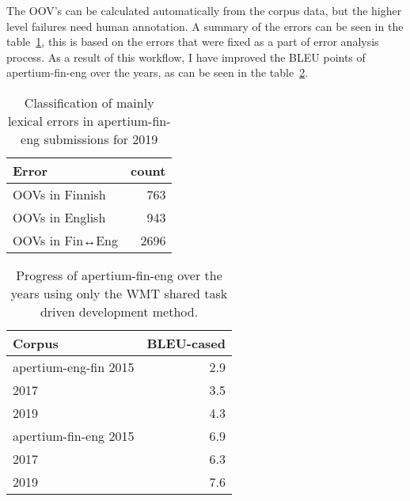 \documentclass[free]{flammie}
\begin{document}
The OOV's can be calculated automatically from the corpus data, but the higher
level failures need human annotation. A summary of the errors can be seen in the
table~\ref{table:errors}, this is based on the errors that were fixed as a part
of error analysis process. As a result of this workflow, I have improved the
BLEU points of apertium-fin-eng over the years, as can be seen in the
table~\ref{table:progress}.

\begin{table}
\begin{center}
    \begin{tabular}{lr}
        \toprule
        Error & count \\
        \midrule
        OOVs in Finnish & 763 \\
        OOVs in English & 943 \\
        OOVs in Fin↔Eng & 2696 \\
        \bottomrule
    \end{tabular}
    \caption{Classification of mainly lexical errors in apertium-fin-eng
    submissions for 2019\label{table:errors}}
\end{center}
\end{table}


\begin{table}
\begin{center}
    \begin{tabular}{lr}
        \toprule
        \bf Corpus & BLEU-cased  \\
        \midrule
        apertium-eng-fin 2015 & 2.9 \\
        \hfill 2017 & 3.5  \\
        \hfill 2019 & 4.3  \\
        \midrule
        apertium-fin-eng 2015 & 6.9\\
        \hfill 2017 & 6.3 \\
        \hfill 2019 & 7.6 \\
        \bottomrule
    \end{tabular}
    \caption{Progress of apertium-fin-eng over the years using only the WMT
    shared task driven development method.\label{table:progress}}
\end{center}
\end{table}
\end{document}

